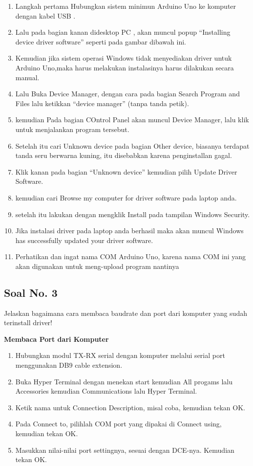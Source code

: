 \begin{enumerate}
	\item Langkah pertama Hubungkan sistem minimun Arduino Uno ke komputer dengan kabel USB .
	\item Lalu pada bagian kanan didesktop PC , akan muncul popup “Installing device driver software” seperti pada gambar dibawah ini.
	\item Kemudian jika sistem  operasi Windows tidak menyediakan driver untuk Arduino Uno,maka harus  melakukan instalasinya harus dilakukan secara manual.
	\item Lalu  Buka Device Manager,  dengan cara pada bagian Search Program and Files lalu ketikkan “device manager” (tanpa tanda petik). 
	\item kemudian Pada bagian COntrol Panel akan muncul Device Manager, lalu klik untuk menjalankan program tersebut.
	\item Setelah itu cari  Unknown device pada bagian Other device, biasanya terdapat tanda seru berwarna kuning, itu disebabkan karena penginstallan gagal.
	\item Klik kanan pada bagian  “Unknown device” kemudian pilih Update Driver Software.
	\item kemudian cari Browse my computer for driver software pada laptop anda.
	\item setelah itu lakukan dengan mengklik Install pada tampilan Windows Security.
	\item Jika instalasi driver pada laptop anda berhasil maka akan muncul Windows has successfully updated your driver software.
	\item Perhatikan dan ingat nama COM Arduino Uno, karena nama COM ini yang akan digunakan untuk meng-upload program nantinya
\end{enumerate}

\subsection{Soal No. 3}
Jelaskan bagaimana cara membaca baudrate dan port dari komputer yang sudah terinstall driver!

\hfill \break
\textbf{Membaca Port dari Komputer}

\begin{enumerate}
	\item Hubungkan modul TX-RX serial dengan komputer melalui serial port menggunakan DB9 cable extension.
	\item Buka Hyper Terminal dengan menekan start kemudian All progams lalu Accessories kemudian Communications lalu Hyper Terminal.
	\item Ketik nama untuk Connection Description, misal coba, kemudian tekan OK.
	\item Pada Connect to, pilihlah COM port yang dipakai di Connect using, kemudian tekan OK.
	\item Masukkan nilai-nilai port settingnya, sesuai dengan DCE-nya. Kemudian tekan OK.
\end{enumerate}



